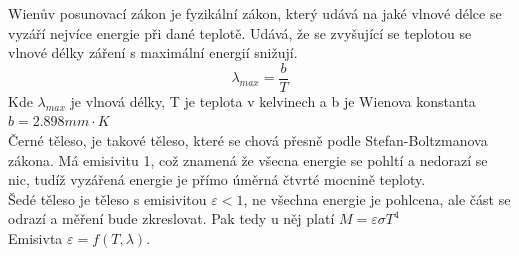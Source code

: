 Wienův posunovací zákon je fyzikální zákon, který udává na jaké vlnové délce se vyzáří nejvíce energie při dané teplotě. Udává, že se zvyšující se teplotou se vlnové délky záření s maximální energií snižují.\\
\begin{equation}
    \lambda_{max} = \frac{b}{T}
\end{equation}
Kde \(\lambda_{max}\) je vlnová délky, T je teplota v kelvinech a b je Wienova konstanta \(b = 2.898mm\cdot K\)\\
Černé těleso, je takové těleso, které se chová přesně podle Stefan-Boltzmanova zákona. Má emisivitu 1, což znamená že všecna energie se pohltí a nedorazí se nic, tudíž vyzářená energie je přímo úměrná čtvrté mocnině teploty.\\
Šedé těleso je těleso s emisivitou \(\varepsilon < 1\), ne všechna energie je pohlcena, ale část se odrazí a měření bude zkreslovat. Pak tedy u něj platí \(M = \varepsilon\sigma T^4\)\\
Emisivta \(\varepsilon = f(T,\lambda)\).\\
